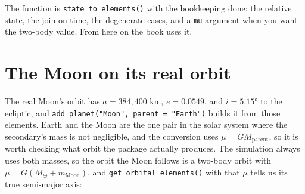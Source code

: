 \documentclass[
  10.5pt,
  letterpaper,
]{scrbook}
\newenvironment{Shaded}{\begin{snugshade}}{\end{snugshade}}
\newcommand{\AttributeTok}[1]{\textcolor[rgb]{0.00,0.00,0.00}{#1}}
\newcommand{\CommentTok}[1]{\textcolor[rgb]{0.00,0.00,0.00}{\textit{#1}}}
\newcommand{\DecValTok}[1]{\textcolor[rgb]{0.00,0.00,0.00}{#1}}
\newcommand{\FunctionTok}[1]{\textcolor[rgb]{0.00,0.00,0.00}{#1}}
\newcommand{\NormalTok}[1]{\textcolor[rgb]{0.00,0.00,0.00}{#1}}
\newcommand{\OtherTok}[1]{\textcolor[rgb]{0.00,0.00,0.00}{#1}}
\newcommand{\SpecialCharTok}[1]{\textcolor[rgb]{0.00,0.00,0.00}{#1}}
\newcommand{\StringTok}[1]{\textcolor[rgb]{0.00,0.00,0.00}{#1}}
\theoremstyle{definition}
\theoremstyle{plain}
\theoremstyle{remark}
\begin{document}
\begin{Shaded}
\end{Shaded}

The function is \texttt{state\_to\_elements()} with the bookkeeping
done: the relative state, the join on time, the degenerate cases, and a
\texttt{mu} argument when you want the two-body value. From here on the
book uses it.

\section{The Moon on its real orbit}\label{the-moon-on-its-real-orbit}

The real Moon's orbit has \(a = 384{,}400\) km, \(e = 0.0549\), and
\(i = 5.15°\) to the ecliptic, and
\texttt{add\_planet("Moon",\ parent\ =\ "Earth")} builds it from those
elements. Earth and the Moon are the one pair in the solar system where
the secondary's mass is not negligible, and the conversion uses
\(\mu = GM_{\mathrm{parent}}\), so it is worth checking what orbit the
package actually produces. The simulation always uses both masses, so
the orbit the Moon follows is a two-body orbit with
\(\mu = G(M_\oplus + m_{\mathrm{Moon}})\), and
\texttt{get\_orbital\_elements()} with that \(\mu\) tells us its true
semi-major axis:
\end{document}
